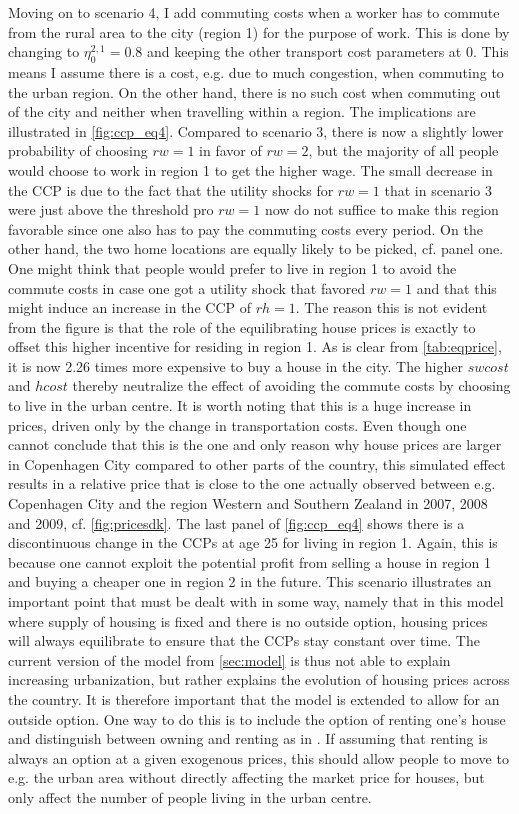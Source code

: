Moving on to scenario 4, I add commuting costs when a worker has to commute from the rural area to the city (region 1) for the purpose of work. This is done by changing to $\eta_0^{2,1}=0.8$ and keeping the other transport cost parameters at 0. This means I assume there is a cost, e.g. due to much congestion, when commuting to the urban region. On the other hand, there is no such cost when commuting out of the city and neither when travelling within a region. The implications are illustrated in \autoref{fig:ccp_eq4}. Compared to scenario 3, there is now a slightly lower probability of choosing $rw=1$ in favor of $rw=2$, but the majority of all people would choose to work in region 1 to get the higher wage. The small decrease in the CCP is due to the fact that the utility shocks for $rw=1$ that in scenario 3 were just above the threshold pro $rw=1$ now do not suffice to make this region favorable since one also has to pay the commuting costs every period. On the other hand, the two home locations are equally likely to be picked, cf. panel one. One might think that people would prefer to live in region 1 to avoid the commute costs in case one got a utility shock that favored $rw=1$ and that this might induce an increase in the CCP of $rh=1$. The reason this is not evident from the figure is that the role of the equilibrating house prices is exactly to offset this higher incentive for residing in region 1. As is clear from \autoref{tab:eqprice}, it is now 2.26 times more expensive to buy a house in the city. The higher $swcost$ and $hcost$ thereby neutralize the effect of avoiding the commute costs by choosing to live in the urban centre. It is worth noting that this is a huge increase in prices, driven only by the change in transportation costs. Even though one cannot conclude that this is the one and only reason why house prices are larger in Copenhagen City compared to other parts of the country, this simulated effect results in a relative price that is close to the one actually observed between e.g. Copenhagen City and the region Western and Southern Zealand in 2007, 2008 and 2009, cf. \autoref{fig:pricesdk}. The last panel of \autoref{fig:ccp_eq4} shows there is a discontinuous change in the CCPs at age 25 for living in region 1. Again, this is because one cannot exploit the potential profit from selling a house in region 1 and buying a cheaper one in region 2 in the future. This scenario illustrates an important point that must be dealt with in some way, namely that in this model where supply of housing is fixed and there is no outside option, housing prices will always equilibrate to ensure that the CCPs stay constant over time. The current version of the model from \autoref{sec:model} is thus not able to explain increasing urbanization, but rather explains the evolution of housing prices across the country. It is therefore important that the model is extended to allow for an outside option. One way to do this is to include the option of renting one's house and distinguish between owning and renting as in \citet{Oswald2015}. If assuming that renting is always an option at a given exogenous prices, this should allow people to move to e.g. the urban area without directly affecting the market price for houses, but only affect the number of people living in the urban centre.
